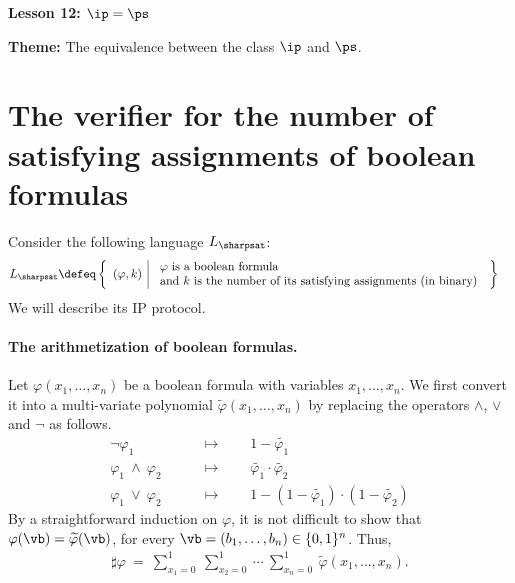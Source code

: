 \documentclass[11pt, a4paper]{article}
\renewcommand{\lesson}{12}
\renewcommand{\lessontitle}{$\ip=\ps$}
\renewcommand{\fulltitle}{Lesson \lesson: \lessontitle}
\begin{document}
\date{}



\begin{center}
{\Large {\bf \fulltitle}}
\end{center}
\vspace{0.5cm}

\noindent
{\bf Theme:} The equivalence between the class $\ip$ and $\ps$.


\section{The verifier for the number of satisfying assignments of boolean formulas}

Consider the following language $L_{\sharpsat}$:
\begin{align*}
L_{\sharpsat} & \defeq  
\left\{
\begin{array}{l|l}
(\varphi,k) &
\begin{array}{l}
\text{$\varphi$ is a boolean formula}\\
\text{and $k$ is the number of its satisfying assignments (in binary)}
\end{array}
\end{array}
\right\}
\end{align*}
We will describe its IP protocol.

\paragraph*{The arithmetization of boolean formulas.}
Let $\varphi(x_1,\ldots,x_n)$ be a boolean formula with variables $x_1,\ldots,x_n$.
We first convert it into a multi-variate polynomial $\widetilde{\varphi}(x_1,\ldots,x_n)$
by replacing the operators $\wedge$, $\vee$ and $\neg$ as follows.
\begin{align*}
\neg \varphi_1 \qquad& \mapsto\qquad 1-\widetilde{\varphi_1}
\\
\varphi_1 \ \wedge \ \varphi_2 \qquad& \mapsto\qquad \widetilde{\varphi_1} \cdot \widetilde{\varphi_2}
\\
\varphi_1 \ \vee \ \varphi_2 \qquad& \mapsto\qquad 1- (1-\widetilde{\varphi_1}) \cdot(1- \widetilde{\varphi_2})
\end{align*}
By a straightforward induction on $\varphi$, it is not difficult to show that
$\varphi(\vb) =\widetilde{\varphi}(\vb)$, for every $\vb=(b_1,\ldots,b_n)\in \{0,1\}^n$.
Thus,
\begin{align*}
\sharp\varphi \ = \
\sum_{x_1=0}^1\ \sum_{x_2=0}^1\ \cdots\ \sum_{x_n=0}^1 \ \widetilde{\varphi}(x_1,\ldots,x_n).
\end{align*}
\end{document}
